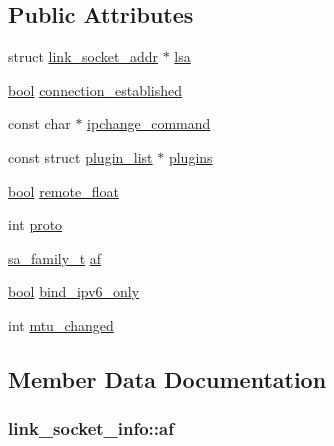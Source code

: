 \subsection*{Public Attributes}
\begin{DoxyCompactItemize}
\item 
struct \hyperlink{structlink__socket__addr}{link\+\_\+socket\+\_\+addr} $\ast$ \hyperlink{structlink__socket__info_a3000ece81909a84b167b6e6f1fd54fd5}{lsa}
\item 
\hyperlink{automatic_8c_abb452686968e48b67397da5f97445f5b}{bool} \hyperlink{structlink__socket__info_a1892e49d2e21facb246a8342d4085e48}{connection\+\_\+established}
\item 
const char $\ast$ \hyperlink{structlink__socket__info_a56b88afb34c0ab5815321fb81aba2427}{ipchange\+\_\+command}
\item 
const struct \hyperlink{structplugin__list}{plugin\+\_\+list} $\ast$ \hyperlink{structlink__socket__info_a66afefd202aee2159647bb43e144e5c0}{plugins}
\item 
\hyperlink{automatic_8c_abb452686968e48b67397da5f97445f5b}{bool} \hyperlink{structlink__socket__info_a595e18b8f2080b760f7ad3d0a5eb7a37}{remote\+\_\+float}
\item 
int \hyperlink{structlink__socket__info_ac30179fadd9ed2ba57d48f8350c8fa38}{proto}
\item 
\hyperlink{syshead_8h_a27a82860cef19f4a53f68516e7b2ee0e}{sa\+\_\+family\+\_\+t} \hyperlink{structlink__socket__info_a258f6f767d919d7cfd2da0c29f9312de}{af}
\item 
\hyperlink{automatic_8c_abb452686968e48b67397da5f97445f5b}{bool} \hyperlink{structlink__socket__info_a98ccece76af85722b5fd9d103f89e407}{bind\+\_\+ipv6\+\_\+only}
\item 
int \hyperlink{structlink__socket__info_a19b340ed3a1f44c74f5ea81643afb928}{mtu\+\_\+changed}
\end{DoxyCompactItemize}


\subsection{Member Data Documentation}
\hypertarget{structlink__socket__info_a258f6f767d919d7cfd2da0c29f9312de}{}
\subsubsection[{af}]{ link\+\_\+socket\+\_\+info\+::af}\label{structlink__socket__info_a258f6f767d919d7cfd2da0c29f9312de}
\hypertarget{structlink__socket__info_a98ccece76af85722b5fd9d103f89e407}{}
